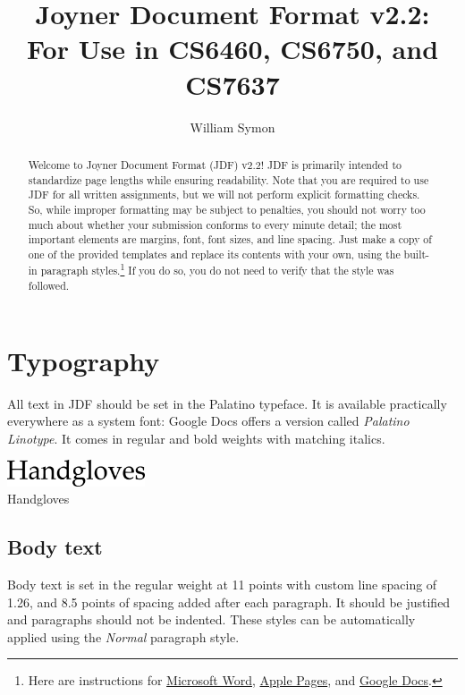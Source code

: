 \documentclass[
	letterpaper, %
]{jdf}
\author{William Symon}
\title{Joyner Document Format v2.2:\\For Use in CS6460, CS6750, and CS7637}
\begin{document}

\maketitle

\begin{abstract}
	Welcome to Joyner Document Format (JDF) v2.2! JDF is primarily intended to standardize page lengths while ensuring readability. Note that you are required to use JDF for all written assignments, but we will not perform explicit formatting checks. So, while improper formatting may be subject to penalties, you should not worry too much about whether your submission conforms to every minute detail; the most important elements are margins, font, font sizes, and line spacing. Just make a copy of one of the provided templates and replace its contents with your own, using the built-in paragraph styles.\footnote{Here are instructions for \href{https://support.office.com/en-us/article/Video-Using-Styles-in-Word-9db4c0f4-2754-4294-9758-c14a0abd8cfa}{Microsoft Word}, \href{https://support.apple.com/guide/pages/intro-to-paragraph-styles-tanaa39b0aa3/mac}{Apple Pages}, and \href{https://www.bazroberts.com/2016/04/19/google-docs-paragraph-styles-headings/}{Google Docs}.} If you do so, you do not need to verify that the style was followed.
\end{abstract}

\section{Typography}
All text in JDF should be set in the Palatino typeface. It is available practically everywhere as a system font: Google Docs offers a version called \emph{Palatino Linotype}. It comes in regular and bold weights with matching italics.

\begin{jdffigure}
\includegraphics[height=0.77cm]{Figures/Handgloves.png} \\
{\huge Handgloves}%
\label{fig:Palatino}%
\end{jdffigure}

\subsection{Body text}
Body text is set in the regular weight at 11 points with custom line spacing of 1.26, and 8.5 points of spacing added after each paragraph. It should be justified and paragraphs should not be indented. These styles can be automatically applied using the \emph{Normal} paragraph style.
\end{document}
